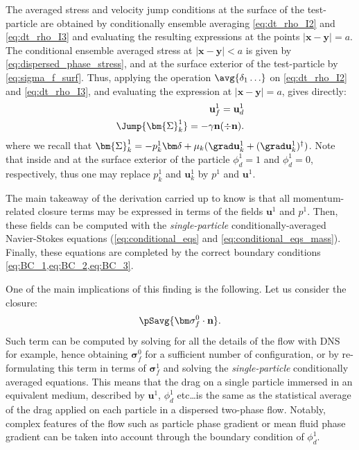 The averaged stress and velocity jump conditions at the surface of the test-particle are obtained by conditionally ensemble averaging \ref{eq:dt_rho_I2} and \ref{eq:dt_rho_I3} and evaluating the resulting expressions at the points $|\textbf{x}-\textbf{y}| =a$. 
The conditional ensemble averaged stress at $|\textbf{x}-\textbf{y}| < a$ is given by \eqref{eq:dispersed_phase_stress}, and at the surface exterior of the test-particle by \ref{eq:sigma_f_surf}. 
Thus, applying the operation $\avg{\delta_1 \ldots}$ on \ref{eq:dt_rho_I2} and \ref{eq:dt_rho_I3}, and evaluating the expression at $|\textbf{x}-\textbf{y}| =a$, gives directly:  
\begin{align}
    \label{eq:BC_2}
    \textbf{u}_f^1 = \textbf{u}_d^1\\
    \Jump{\bm{\Sigma}_k^1} 
    =
    - \gamma\textbf{n}(\div \textbf{n}). 
    \label{eq:BC_3}
\end{align}
where we recall that $\bm{\Sigma}_k^1 = -p_k^1\bm\delta + \mu_k (\grad \textbf{u}_k^1 + (\grad \textbf{u}_k^1)^\dagger)$. 
Note that inside and at the surface exterior of the particle $\phi_d^1 = 1$ and $\phi_d^1 =0$, respectively, thus one may replace $p_k^1$ and $\textbf{u}_k^1$ by $p^1$ and $\textbf{u}^1$. 



The main takeaway of the derivation carried up to know is that all momentum-related closure terms may be expressed in terms of the fields $\textbf{u}^1$ and $p^1$. 
Then, these fields can be computed with the \textit{single-particle} conditionally-averaged Navier-Stokes equations (\ref{eq:conditional_eqs} and \ref{eq:conditional_eqs_mass}). 
Finally, these equations are completed by the correct boundary conditions \ref{eq:BC_1,eq:BC_2,eq:BC_3}. 

One of the main implications of this finding is the following.
Let us consider the closure: 
\begin{equation}
    \pSavg{\bm\sigma_f^0 \cdot \textbf{n}}. 
\end{equation}
Such term can be computed by solving for all the details of the flow with DNS for example, hence obtaining $\bm\sigma_f^0$ for a sufficient number of configuration, 
or by re-formulating this term in terms of $\bm\sigma_f^1$ and solving the \textit{single-particle} conditionally averaged equations.
This means that the drag on a single particle immersed in an equivalent medium, described by $\textbf{u}^1$, $\phi_d^1$ etc\ldots is the same as the statistical average of the drag applied on each particle in a dispersed two-phase flow. 
Notably, complex features of the flow such as particle phase gradient or mean fluid phase gradient can be taken into account through the boundary condition of $\phi_d^1$. 

